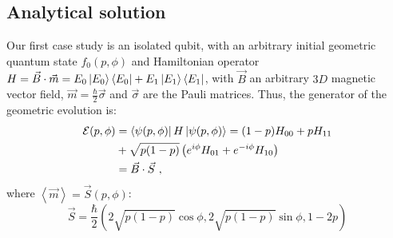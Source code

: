 \documentclass[draft,nofootinbib,pre,twocolumn,showpacs,showkeys,preprintnumbers,floatfix]{revtex4-1}
\newcommand{\1}{\mathbbm{1}}
\newcommand{\MV}[1]{\left\langle #1 \right\rangle}
\begin{document}
\subsection*{Analytical solution}

Our first case study is an isolated qubit, with an arbitrary initial geometric quantum 
state $f_0(p,\phi)$ and Hamiltonian operator $H = \vec{B} \cdot \vec{m} = E_0 \ket{E_0}\bra{E_0} + E_1 \ket{E_1}\bra{E_1}$,
with $\vec{B}$ an arbitrary $3D$ magnetic vector field, $\vec{m} = \frac{\hbar}{2}\vec{\sigma}$
and $\vec{\sigma}$ are the Pauli matrices. Thus, the generator of the geometric evolution is:
\begin{align}
\mathcal{E}(p,\phi) & = \bra{\psi(p,\phi)}H\ket{\psi(p,\phi)} = (1-p)H_{00} + p H_{11} \nonumber \\
&+ \sqrt{p(1-p)} \left(e^{i\phi}H_{01}+e^{-i\phi}H_{10} \right) \\
& = \vec{B} \cdot \vec{S} \nonumber~,
\end{align}
where $\MV{\vec{m}}=\vec{S}(p,\phi)$:
\begin{equation}
\vec{S}= \frac{\hbar}{2}\left( 2\sqrt{p(1-p)}\cos \phi, 2\sqrt{p(1-p)}\sin \phi , 1-2p\right)\nonumber
\end{equation}
\end{document}

